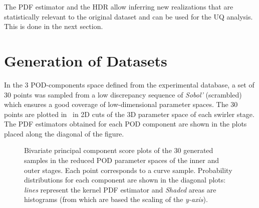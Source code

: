 The PDF estimator and the HDR allow inferring new realizations that are statistically relevant to the original dataset and can be used for the UQ analysis. This is done in the next section. 

\section{Generation of Datasets }\label{sec:res}

In the 3 POD-components space defined from the experimental database, a set of 30 points was sampled from a low discrepancy sequence of \emph{Sobol'} (scrambled)~\cite{Cavazzuti2013,Kucherenko2015} which ensures a good coverage of low-dimensional parameter spaces. The 30 points are plotted in ~in 2D cuts of the 3D parameter space of each swirler stage. The PDF estimators obtained for each POD component are shown in the plots placed along the diagonal of the figure.  

\begin{figure}[!ht]
\centering
{}
\caption{Bivariate principal component score plots of the 30 generated samples in the reduced POD parameter spaces of the inner and outer stages. Each point corresponds to a curve sample. Probability distributions for each component are shown in the diagonal plots: \emph{lines} represent the kernel PDF estimator and \emph{Shaded} areas are histograms (from which are based the scaling of the \emph{y-axis}).}
\label{fig:samples-scatter}
\end{figure}

